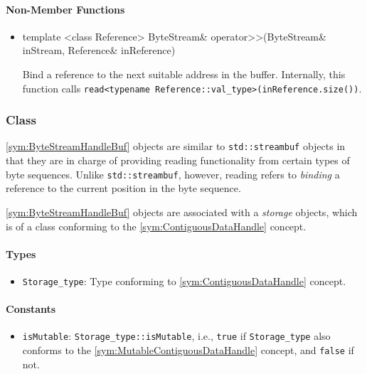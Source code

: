 \paragraph{Non-Member Functions}

\begin{itemize}
	\item
		\begin{cppsnippet}
		template <class Reference>
		ByteStream& operator>>(ByteStream& inStream, Reference& inReference)
		\end{cppsnippet}

		Bind a reference to the next suitable address in the buffer. Internally, this function calls \texttt{read<typename Reference::val\_type>(inReference.size())}.
\end{itemize}

\subsubsection[Class ByteStreamHandleBuf]{Class }

\ref{sym:ByteStreamHandleBuf} objects are similar to \texttt{std::streambuf} objects in that they are in charge of providing reading functionality from certain types of byte sequences. Unlike \texttt{std::streambuf}, however, reading refers to \emph{binding} a reference to the current position in the byte sequence.

\ref{sym:ByteStreamHandleBuf} objects are associated with a \emph{storage} objects, which is of a class conforming to the \ref{sym:ContiguousDataHandle} concept.

\paragraph{Types}

\begin{itemize}
	\item \texttt{Storage\_type}: Type conforming to \ref{sym:ContiguousDataHandle} concept.
\end{itemize}

\paragraph{Constants}

\begin{itemize}
	\item \texttt{isMutable}: \texttt{Storage\_type::isMutable}, i.e., \texttt{true} if \texttt{Storage\_type} also conforms to the \ref{sym:MutableContiguousDataHandle} concept, and \texttt{false} if not.
\end{itemize}

